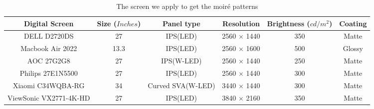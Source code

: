 \begin{table*}[t]

\centering
\vspace{-8pt}
\scalebox{1.0}
{      %
\begin{tabular}{c|ccccc}
\toprule[1.25pt]
Digital Screen    & Size ($Inches$) & Panel type        & Resolution         & Brightness ($cd/m^2$) & Coating \\
\midrule
DELL D2720DS      & 27              & IPS(LED)          & 2560 $\times$ 1440 & 350                   & Matte      \\
Macbook Air 2022  & 13.3            & IPS(LED)          & 2560 $\times$ 1600 & 500                   & Glossy     \\
AOC 27G2G8        & 27              & IPS(W-LED)        & 2560 $\times$ 1440 & 250                   & Matte      \\
Philips 27E1N5500 & 27              & IPS(LED)          & 2560 $\times$ 1440 & 300                   & Matte      \\
Xiaomi C34WQBA-RG & 34              & Curved SVA(W-LED) & 3440 $\times$ 1440 & 300                   & Matte      \\
ViewSonic VX2771-4K-HD & 27         & IPS(LED)          & 3840 $\times$ 2160 & 350                   & Matte      \\
\bottomrule[1.25pt]
\end{tabular}
}
\caption{The screen we apply to get the moiré patterns}
\label{tab:Datasets-Screen}
\end{table*}



